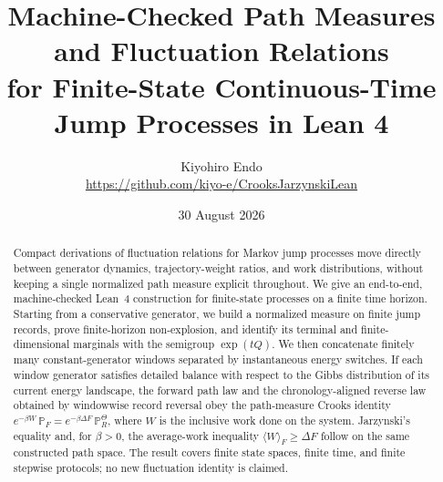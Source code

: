 \documentclass[11pt]{article}
\title{Machine-Checked Path Measures and Fluctuation Relations\\
for Finite-State Continuous-Time Jump Processes in Lean 4}
\author{Kiyohiro Endo\\
\small \url{https://github.com/kiyo-e/CrooksJarzynskiLean}}
\date{30 August 2026}
\newcommand{\Pp}{\mathbb{P}}
\begin{document}
\maketitle

\begin{abstract}
Compact derivations of fluctuation relations for Markov jump processes move directly between generator dynamics, trajectory-weight ratios, and work distributions, without keeping a single normalized path measure explicit throughout. We give an end-to-end, machine-checked Lean~4 construction for finite-state processes on a finite time horizon. Starting from a conservative generator, we build a normalized measure on finite jump records, prove finite-horizon non-explosion, and identify its terminal and finite-dimensional marginals with the semigroup $\exp(tQ)$. We then concatenate finitely many constant-generator windows separated by instantaneous energy switches. If each window generator satisfies detailed balance with respect to the Gibbs distribution of its current energy landscape, the forward path law and the chronology-aligned reverse law obtained by windowwise record reversal obey the path-measure Crooks identity $e^{-\beta W}\,\Pp_F = e^{-\beta\Delta F}\,\Pp_R^{\Theta}$, where $W$ is the inclusive work done on the system. Jarzynski's equality and, for $\beta>0$, the average-work inequality $\langle W\rangle_F \ge \Delta F$ follow on the same constructed path space. The result covers finite state spaces, finite time, and finite stepwise protocols; no new fluctuation identity is claimed.
\end{abstract}














\printbibliography
\end{document}
